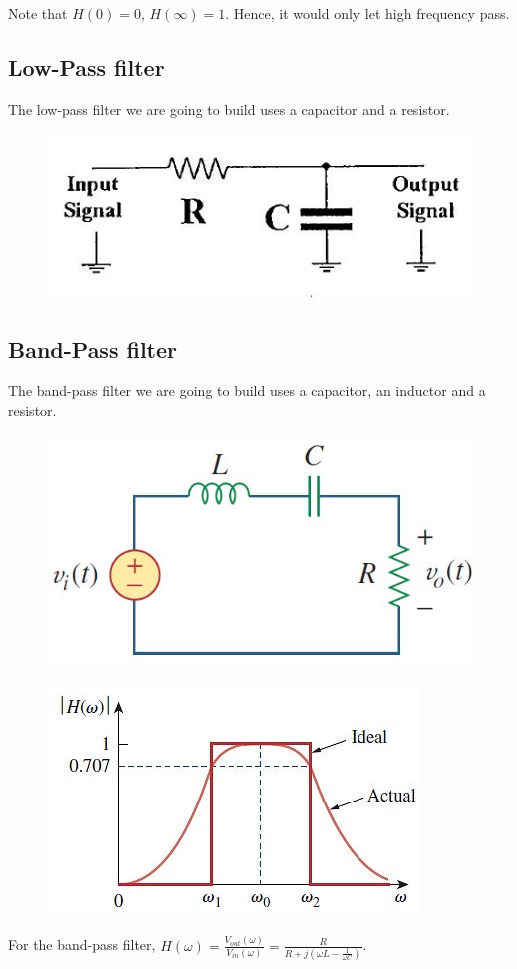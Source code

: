 \documentclass[a4paper]{report}
\begin{document}
Note that $H(0)=0$, $H(\infty)=1$. Hence, it would only let high frequency pass.
\subsection{Low-Pass filter}
The low-pass filter we are going to build uses a capacitor and a resistor.
\begin{figure}[H]
	\centering
	\includegraphics[width=0.8\linewidth]{4.jpg}
\end{figure}
\subsection{Band-Pass filter}
The band-pass filter we are going to build uses a capacitor, an inductor and a resistor.
\begin{figure}[H]
	\centering
	\includegraphics[width=0.8\linewidth]{5.jpg}
\end{figure}
\begin{figure}[H]
	\centering
	\includegraphics[width=0.8\linewidth]{6.jpg}
\end{figure}
For the band-pass filter, $H(\omega)=\frac{V_{out}(\omega)}{V_{in}(\omega)}=\frac{R}{R+j(\omega L-\frac{1}{\omega C})}$.
\end{document}
